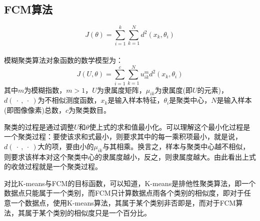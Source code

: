 \documentclass[lang=cn,11pt]{elegantpaper}
\begin{document}
\subsection{FCM算法}
\begin{equation*}
J(\theta)=\sum_{i=1}^k\sum_{k=1}^N d^2(x_k,\theta_i)
\end{equation*}
\\ 模糊聚类算法对象函数的数学模型为：
\begin{equation*}
	J(U,\theta)=\sum_{i=1}^c\sum_{k=1}^Nu_{ik}^m d^2(x_k,\theta_i)
\end{equation*}
其中$m$为模糊指数，$m>1$，$U$为隶属度矩阵，$\mu_{ik}$为隶属度(即$U$的元素)，
\ $d(\ \cdot \ , \ \cdot \ )$为不相似测度函数，$x_k$是输入样本特征，$\theta_i$是聚类中心，$N$是输入样本(即图像像素)总数，$c$为聚类数目。
\par 聚类的过程是通过调整$U$和$\theta$使上式的求和值最小化。可以理解这个最小化过程是一个聚类过程：要使该求和式最小，则要求其中的每一乘积项最小，就是说，$d(\ \cdot \ , \ \cdot \ )$大的项，要由小的$\mu_{ik}$与其相乘。换言之，样本与聚类中心越不相似，则要求该样本对这个聚类中心的隶属度越小，反之，则隶属度越大。由此看出上式的收敛过程就是一个聚类过程。
\par 对比K-means与FCM的目标函数，可以知道，K-means是排他性聚类算法，即一个数据点只能属于一个类别，而FCM只计算数据点雨各个类别的相似度，即对于任意一个数据点，使用K-means算法，其属于某个类别非否即是，而对于FCM算法，其属于某个类别的相似度只是一个百分比。





\newpage
\nocite{*}



\end{document}
